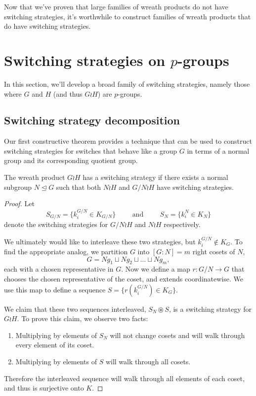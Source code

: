 Now that we've proven that large families of wreath products do not have
switching strategies, it's worthwhile to construct families of wreath products
that do have switching strategies.
%
%
\section{Switching strategies on \texorpdfstring{$p$}{p}-groups}
\label{sec:pGroupStrategy}
In this section, we'll develop a broad family of switching strategies,
namely those where $G$ and $H$ (and thus $G \wr H$) are $p$-groups.
\subsection{Switching strategy decomposition}

Our first constructive theorem provides a technique that can be used to
construct switching strategies for switches that behave like a group $G$ in
terms of a normal group and its corresponding quotient group.
\begin{theorem}
  The wreath product $G \wr H$ has a switching strategy if there exists a
  normal subgroup $N \trianglelefteq G$ such that both $N \wr H$ and
  $G/N \wr H$ have switching strategies.
\label{thm:switchingStrategyDecomposition}
\end{theorem}
\begin{proof}
  Let \[
    S_{G/N} = \{k_i^{G/N} \in K_{G/N}\}
    \hspace{1cm}\text{and}\hspace{1cm}
    S_{N} = \{k_i^N \in K_{N}\}
  \] denote the switching strategies for ${G/N \wr H}$ and ${N \wr H}$
  respectively.

  We ultimately would like to interleave these two strategies,
  but $k_i^{G/N} \not\in K_G$. To find the appropriate analog,
  we partition $G$ into $[G : N] = m$ right cosets of $N$, \begin{equation}
    G = Ng_1 \sqcup Ng_2 \sqcup \dots \sqcup Ng_m,
  \end{equation} each with a chosen representative in $G$.
  Now we define a map $r \colon G/N \rightarrow G$ that chooses the chosen
  representative of the coset, and extends coordinatewise. We use this map to
  define a sequence $S = \{r(k_i^{G/N}) \in K_G\}$.

  We claim that these two sequences interleaved, $S_N \circledast S$, is a
  switching strategy for $G \wr H$. To prove this claim, we observe two facts:
  \begin{enumerate}
    \item Multiplying by elements of $S_N$ will not change cosets and will walk
    through every element of its coset.
    \item Multiplying by elements of $S$ will walk through all cosets.
  \end{enumerate}
  Therefore the interleaved sequence will walk through all elements of each
  coset, and thus is surjective onto $K$.
\end{proof}

